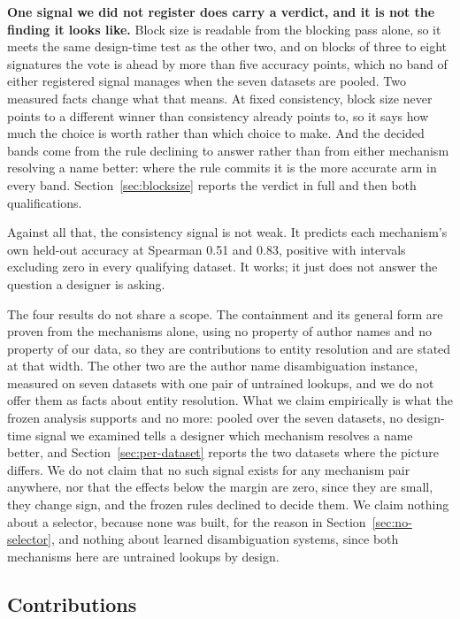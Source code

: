 \documentclass[11pt]{article}
\begin{document}
\textbf{One signal we did not register does carry a verdict, and it is not the
finding it looks like.} Block size is readable from the blocking pass alone,
so it meets the same design-time test as the other two, and on blocks of three
to eight signatures the vote is ahead by more than five accuracy points, which no band of either registered signal manages when the seven datasets are pooled. Two measured facts change what
that means. At fixed consistency, block size never points to a different
winner than consistency already points to, so it says how much the choice is
worth rather than which choice to make. And the decided bands come from the
rule declining to answer rather than from either mechanism resolving a name
better: where the rule commits it is the more accurate arm in every band.
Section~\ref{sec:blocksize} reports the verdict in full and then both
qualifications.

Against all that, the consistency signal is not weak. It predicts each
mechanism's own held-out accuracy at Spearman 0.51 and 0.83, positive with
intervals excluding zero in every qualifying dataset. It works; it just does
not answer the question a designer is asking.

The four results do not share a scope. The containment and its general form
are proven from the mechanisms alone, using no property of author names and no
property of our data, so they are contributions to entity resolution and are
stated at that width. The other two are the author name disambiguation
instance, measured on seven datasets with one pair of untrained lookups, and
we do not offer them as facts about entity resolution. What we claim empirically is what the frozen analysis supports and no more: pooled over the seven datasets, no design-time signal we examined tells a designer which mechanism resolves a name better, and Section~\ref{sec:per-dataset} reports the two datasets where the picture differs. We
do not claim that no such signal exists for any mechanism pair anywhere, nor
that the effects below the margin are zero, since they are small, they change
sign, and the frozen rules declined to decide them. We claim nothing about a
selector, because none was built, for the reason in
Section~\ref{sec:no-selector}, and nothing about learned disambiguation
systems, since both mechanisms here are untrained lookups by design.

\subsection{Contributions}
\label{sec:contributions}
\end{document}
